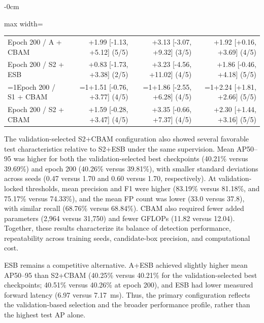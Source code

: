 \documentclass[energies,article,submit,pdftex,moreauthors]{Definitions/mdpi}
\providecommand{\revisionmode}{0}
\newcommand{\rev}[1]{\ifnum\revisionmode=1\relax{\color{red}#1}\else#1\fi}
\begin{document}
\begin{table}[H]
\begin{adjustwidth}{-\extralength}{0cm}
\begin{adjustbox}{max width=\fulllength}
\begin{tabular}{lrrr}
Epoch 200 / A + CBAM & +1.99 [-1.13, +5.12] (5/5) & +3.13 [-3.07, +9.32] (3/5) & +1.92 [+0.16, +3.69] (4/5) \\
Epoch 200 / S2 + ESB & +0.83 [-1.73, +3.38] (2/5) & +3.23 [-4.56, +11.02] (4/5) & +1.86 [-0.46, +4.18] (5/5) \\
\rev{Epoch 200 / S1 + CBAM} & \rev{+1.51 [-0.76, +3.77] (4/5)} & \rev{+1.86 [-2.55, +6.28] (4/5)} & \rev{+2.24 [+1.81, +2.66] (5/5)} \\
Epoch 200 / S2 + CBAM & +1.59 [-0.28, +3.47] (4/5) & +3.35 [-0.66, +7.37] (4/5) & +2.30 [+1.44, +3.16] (5/5) \\
\bottomrule\end{tabular}\end{adjustbox}
\par\vspace{3pt}{\footnotesize\raggedright Values are mean differences in percentage points (pp), followed by unadjusted 95\% paired CIs and the number of seeds with $\Delta>0$. Best denotes the native fused-validation-selected checkpoint.\par}
\end{adjustwidth}
\end{table}

The validation-selected S2+CBAM configuration also showed several favorable test characteristics relative to S2+ESB under the same supervision. Mean AP50--95 was higher for both the validation-selected best checkpoints (40.21\% versus 39.69\%) and epoch 200 (40.26\% versus 39.81\%), with smaller standard deviations across seeds (0.47 versus 1.70 and 0.60 versus 1.70, respectively). At validation-locked thresholds, mean precision and F1 were higher (83.19\% versus 81.18\%, and 75.17\% versus 74.33\%), and the mean FP count was lower (33.0 versus 37.8), with similar recall (68.76\% versus 68.84\%). CBAM also required fewer added parameters (2,964 versus 31,750) and fewer GFLOPs (11.82 versus 12.04). Together, these results characterize its balance of detection performance, repeatability across training seeds, candidate-box precision, and computational cost.

ESB remains a competitive alternative. A+ESB achieved slightly higher mean AP50--95 than S2+CBAM (40.25\% versus 40.21\% for the validation-selected best checkpoints; 40.51\% versus 40.26\% at epoch 200), and ESB had lower measured forward latency (6.97 versus 7.17~ms). Thus, the primary configuration reflects the validation-based selection and the broader performance profile, rather than the highest test AP alone.
\end{document}
